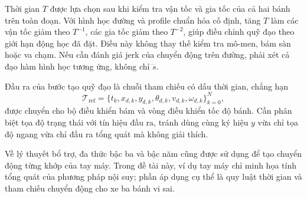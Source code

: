 \documentclass[12pt,a4paper,oneside]{report}
\begin{document}
Thời gian \(T\) được lựa chọn sau khi kiểm tra vận tốc và gia tốc của cả hai bánh trên toàn đoạn. Với hình học đường và profile chuẩn hóa cố định, tăng \(T\) làm các vận tốc giảm theo \(T^{-1}\), các gia tốc giảm theo \(T^{-2}\), giúp điều chỉnh quỹ đạo theo giới hạn động học đã đặt. Điều này không thay thế kiểm tra mô-men, bám sàn hoặc va chạm. Nếu cần đánh giá jerk của chuyển động trên đường, phải xét cả đạo hàm hình học tương ứng, không chỉ \(\dddot s\).

Đầu ra của bước tạo quỹ đạo là chuỗi tham chiếu có dấu thời gian, chẳng hạn
\[
  \mathcal T_{\mathrm{ref}}=
  \{t_k,x_{d,k},y_{d,k},\theta_{d,k},v_{d,k},\omega_{d,k}\}_{k=0}^{N},
\]
được chuyển cho bộ điều khiển bám và vòng điều khiển tốc độ bánh. Cần phân biệt tọa độ trạng thái với tín hiệu đầu ra, tránh dùng cùng ký hiệu \(y\) vừa chỉ tọa độ ngang vừa chỉ đầu ra tổng quát mà không giải thích.

Về lý thuyết bổ trợ, đa thức bậc ba và bậc năm cũng được sử dụng để tạo chuyển động từng khớp của tay máy. Trong đề tài này, ví dụ tay máy chỉ minh họa tính tổng quát của phương pháp nội suy; phần áp dụng cụ thể là quy luật thời gian và tham chiếu chuyển động cho xe ba bánh vi sai.
\end{document}
